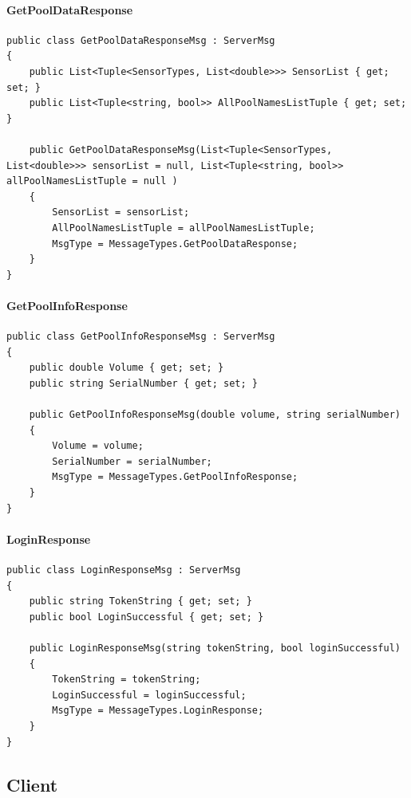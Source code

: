 \paragraph{GetPoolDataResponse}
\begin{lstlisting}[caption=GetPoolDataResponse, label=code:GetPoolDataResponse]
public class GetPoolDataResponseMsg : ServerMsg
{
	public List<Tuple<SensorTypes, List<double>>> SensorList { get; set; }
	public List<Tuple<string, bool>> AllPoolNamesListTuple { get; set; }
	
	public GetPoolDataResponseMsg(List<Tuple<SensorTypes, List<double>>> sensorList = null, List<Tuple<string, bool>> allPoolNamesListTuple = null )
	{
		SensorList = sensorList;
		AllPoolNamesListTuple = allPoolNamesListTuple;
		MsgType = MessageTypes.GetPoolDataResponse;
	}
}
\end{lstlisting}

\paragraph{GetPoolInfoResponse}
\begin{lstlisting}[caption=GetPoolInfoResponse, label=code:GetPoolInfoResponse]
public class GetPoolInfoResponseMsg : ServerMsg
{
	public double Volume { get; set; }
	public string SerialNumber { get; set; }
	
	public GetPoolInfoResponseMsg(double volume, string serialNumber)
	{
		Volume = volume;
		SerialNumber = serialNumber;
		MsgType = MessageTypes.GetPoolInfoResponse;
	}
}
\end{lstlisting}

\paragraph{LoginResponse}
\begin{lstlisting}[caption=LoginResponse, label=code:LoginResponse]
public class LoginResponseMsg : ServerMsg
{
	public string TokenString { get; set; }
	public bool LoginSuccessful { get; set; }
	
	public LoginResponseMsg(string tokenString, bool loginSuccessful)
	{
		TokenString = tokenString;
		LoginSuccessful = loginSuccessful;
		MsgType = MessageTypes.LoginResponse;
	}
}
\end{lstlisting}

\subsection{Client}

